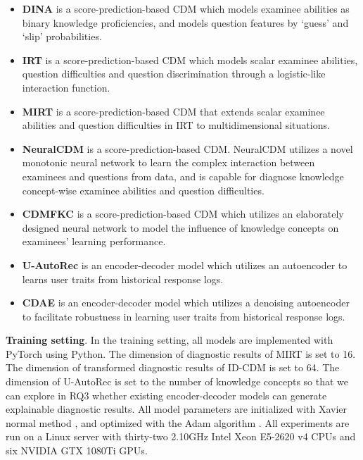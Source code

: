 \documentclass[sigconf]{acmart}
\begin{document}
\begin{itemize}[leftmargin=*]
  \item \textbf{DINA} \cite{Torre2009} is a score-prediction-based CDM which models examinee abilities as binary knowledge proficiencies, and models question features by `guess' and `slip' probabilities. 
  \item \textbf{IRT} \cite{Brzezinska2020} is a score-prediction-based CDM which models scalar examinee abilities, question difficulties and question discrimination through a logistic-like interaction function.
  \item \textbf{MIRT} \cite{Reckase2009} is a score-prediction-based CDM that extends scalar examinee abilities and question difficulties in IRT to multidimensional situations.
  \item \textbf{NeuralCDM} \cite{WangF2022} is a score-prediction-based CDM. NeuralCDM utilizes a novel monotonic neural network to learn the complex interaction between examinees and questions from data, and is capable for diagnose knowledge concept-wise examinee abilities and question difficulties.
  \item \textbf{CDMFKC} \cite{ShengLi2022} is a score-prediction-based CDM which utilizes an elaborately designed neural network to model the influence of knowledge concepts on examinees' learning performance.
  \item \textbf{U-AutoRec} \cite{Sedhain2015} is an encoder-decoder model which utilizes an autoencoder to learns user traits from historical response logs.
  \item \textbf{CDAE} \cite{WuDZE2016} is an encoder-decoder model which utilizes a denoising autoencoder to facilitate robustness in learning user traits from historical response logs.
\end{itemize}

\noindent\textbf{Training setting}. In the training setting, all models are implemented with PyTorch using Python. The dimension of diagnostic results of MIRT is set to 16. The dimension of transformed diagnostic results of ID-CDM is set to 64. The dimension of U-AutoRec is set to the number of knowledge concepts so that we can explore in RQ3 whether existing encoder-decoder models can generate explainable diagnostic results. All model parameters are initialized with Xavier normal method \cite{GlorotB2010}, and optimized with the Adam algorithm \cite{KingmaB2014}. All experiments are run on a Linux server with thirty-two 2.10GHz Intel Xeon E5-2620 v4 CPUs and six NVIDIA GTX 1080Ti GPUs.
\end{document}
